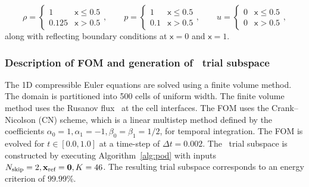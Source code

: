 \begin{equation*}
\rho = 
\begin{cases} 
      1 & \mathsf{x}\leq 0.5 \\
      0.125 & \mathsf{x} > 0.5 
   \end{cases},
\qquad
p = 
\begin{cases} 
      1 & \mathsf{x}\leq 0.5 \\
      0.1 & \mathsf{x} > 0.5 
   \end{cases},
\qquad
u = 
\begin{cases} 
      0 & \mathsf{x}\leq 0.5 \\
      0 & \mathsf{x} > 0.5 
   \end{cases},
\end{equation*}
along with reflecting boundary conditions at $\mathsf{x}=0$ and $\mathsf{x}=1$. 

\subsubsection{Description of FOM and generation of \spatialAcronym\ trial subspace}\label{sec:sod_fom}
The 1D compressible Euler equations are solved using a finite volume method. The domain is partitioned into 500 cells of uniform width. The finite volume method uses the Rusanov flux~\cite{rusanov} at the cell interfaces. The FOM uses the Crank--Nicolson (CN) scheme, which is a linear multistep method defined by the coefficients $\alpha_0 = 1,\alpha_1 = -1, \beta_0 = \beta_1 = 1/2$, for temporal integration. The FOM is evolved for $t \in [0.0,1.0]$ at a time-step of $\Delta t = 0.002$. The \spatialAcronym\ trial subspace is constructed by executing Algorithm~\ref{alg:pod} with inputs $N_{\text{skip}}=2, \mathbf{x}_\text{ref} = \boldsymbol 0, K=46 $. The resulting trial subspace corresponds to an energy criterion of $99.99\%$.

